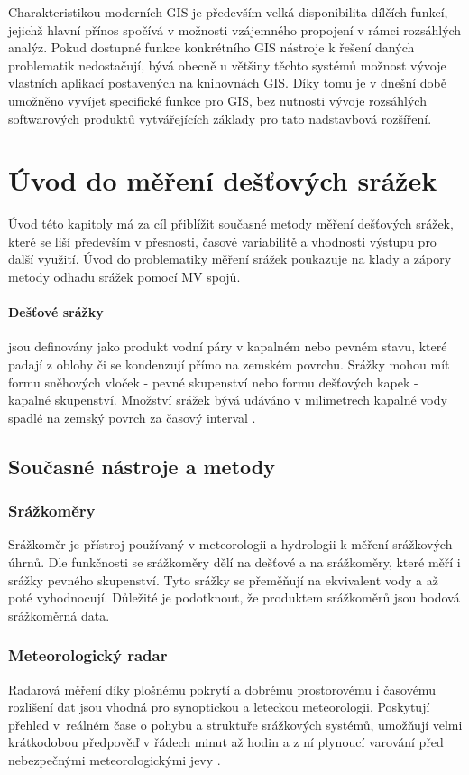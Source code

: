 \documentclass[a4paper,12pt,oneside]{report}
\begin{document}
Charakteristikou moderních GIS je především velká disponibilita
dílčích funkcí, jejichž hlavní přínos spočívá v možnosti vzájemného
propojení v rámci rozsáhlých analýz. Pokud dostupné funkce konkrétního
GIS nástroje k řešení daných problematik nedostačují, bývá obecně u
většiny těchto systémů možnost vývoje vlastních aplikací postavených
na knihovnách GIS. Díky tomu je v dnešní době umožněno vyvíjet
specifické funkce pro GIS, bez nutnosti vývoje rozsáhlých softwarových
produktů vytvářejících základy pro tato nadstavbová rozšíření.



\section{Úvod do měření dešťových srážek}
Úvod této kapitoly má za cíl přiblížit současné metody měření dešťových
srážek, které se liší především v přesnosti, časové variabilitě a
vhodnosti výstupu pro další využití. Úvod do problematiky měření
srážek poukazuje na klady a zápory metody odhadu srážek pomocí MV spojů.


\paragraph*{Dešťové srážky} jsou definovány jako produkt vodní páry v
kapalném nebo pevném stavu, které padají z oblohy či se kondenzují přímo
na zemském povrchu. Srážky mohou mít formu sněhových vloček - pevné
skupenství nebo formu dešťových kapek - kapalné skupenství. Množství
srážek bývá udáváno v milimetrech kapalné vody spadlé na zemský povrch
za časový interval \cite{wmo}.

\subsection{Současné nástroje a metody }
\label{subsec:11}

\subsubsection{Srážkoměry}
Srážkoměr je přístroj používaný v meteorologii a hydrologii k měření
srážkových úhrnů. Dle funkčnosti se srážkoměry dělí na dešťové a na
srážkoměry, které měří i srážky pevného skupenství. Tyto srážky se
přeměňují na ekvivalent vody a až poté vyhodnocují. Důležité je
podotknout, že produktem srážkoměrů jsou bodová srážkoměrná data.

\subsubsection{Meteorologický radar}
Radarová měření díky plošnému pokrytí a dobrému prostorovému i
časovému rozlišení dat jsou vhodná pro synoptickou a leteckou
meteorologii. Poskytují přehled v~reálném čase o pohybu a struktuře
srážkových systémů, umožňují velmi krátko\-dobou předpověď v řádech
minut až hodin a z ní plynoucí varování před nebezpečný\-mi
meteorologickými jevy \cite{radar_chmu}.
\end{document}
